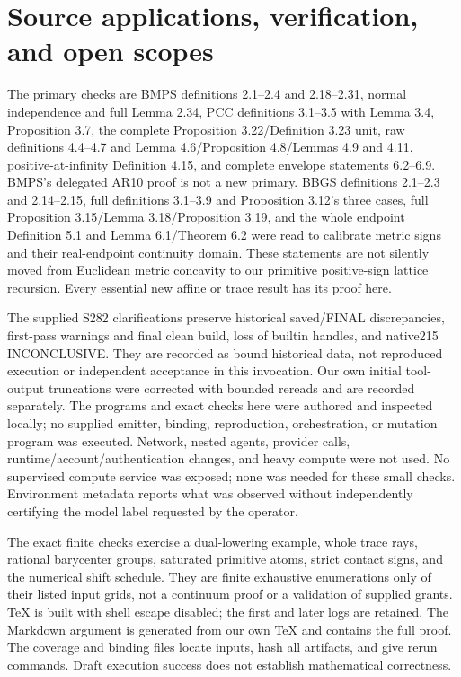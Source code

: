 \documentclass[11pt]{article}
\theoremstyle{definition}\newtheorem{definition}[theorem]{Definition}
\theoremstyle{remark}\newtheorem{remark}[theorem]{Remark}
\begin{document}
\section{Source applications, verification, and open scopes}
The primary checks are BMPS definitions 2.1--2.4 and 2.18--2.31, normal independence and full Lemma 2.34, PCC definitions 3.1--3.5 with Lemma 3.4, Proposition 3.7, the complete Proposition 3.22/Definition 3.23 unit, raw definitions 4.4--4.7 and Lemma 4.6/Proposition 4.8/Lemmas 4.9 and 4.11, positive-at-infinity Definition 4.15, and complete envelope statements 6.2--6.9. BMPS's delegated AR10 proof is not a new primary. BBGS definitions 2.1--2.3 and 2.14--2.15, full definitions 3.1--3.9 and Proposition 3.12's three cases, full Proposition 3.15/Lemma 3.18/Proposition 3.19, and the whole endpoint Definition 5.1 and Lemma 6.1/Theorem 6.2 were read to calibrate metric signs and their real-endpoint continuity domain. These statements are not silently moved from Euclidean metric concavity to our primitive positive-sign lattice recursion. Every essential new affine or trace result has its proof here.

The supplied S282 clarifications preserve historical saved/FINAL discrepancies, first-pass warnings and final clean build, loss of builtin handles, and native215 INCONCLUSIVE. They are recorded as bound historical data, not reproduced execution or independent acceptance in this invocation. Our own initial tool-output truncations were corrected with bounded rereads and are recorded separately. The programs and exact checks here were authored and inspected locally; no supplied emitter, binding, reproduction, orchestration, or mutation program was executed. Network, nested agents, provider calls, runtime/account/authentication changes, and heavy compute were not used. No supervised compute service was exposed; none was needed for these small checks. Environment metadata reports what was observed without independently certifying the model label requested by the operator.

The exact finite checks exercise a dual-lowering example, whole trace rays, rational barycenter groups, saturated primitive atoms, strict contact signs, and the numerical shift schedule. They are finite exhaustive enumerations only of their listed input grids, not a continuum proof or a validation of supplied grants. TeX is built with shell escape disabled; the first and later logs are retained. The Markdown argument is generated from our own TeX and contains the full proof. The coverage and binding files locate inputs, hash all artifacts, and give rerun commands. Draft execution success does not establish mathematical correctness.
\end{document}
